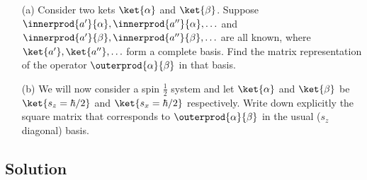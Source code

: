 \begin{itemize}
\item[(a)] Consider two kets $\ket{\alpha}$ and $\ket{\beta}$.  Suppose
  $\innerprod{a'}{\alpha}, \innerprod{a''}{\alpha}, \ldots$ and
  $\innerprod{a'}{\beta}, \innerprod{a''}{\beta}, \ldots$ are all
  known, where $\ket{a'},\ket{a''},\ldots$ form a complete basis.
  Find the matrix representation of the operator
  $\outerprod{\alpha}{\beta}$ in that basis.
\item[(b)] We will now consider a spin $\frac{1}{2}$ system and let
  $\ket{\alpha}$ and $\ket{\beta}$ be $\ket{s_z = \hbar/2}$ and $\ket{s_x
  = \hbar/2}$ respectively.  Write down explicitly the square matrix that
  corresponds to $\outerprod{\alpha}{\beta}$ in the usual ($s_z$
  diagonal) basis.
\end{itemize}

\subsection*{Solution}

